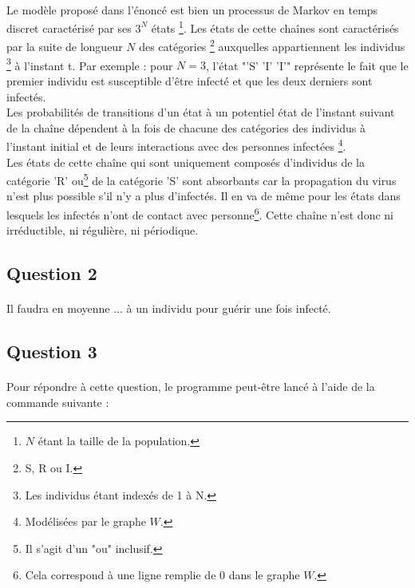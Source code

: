 \documentclass[a4paper, 12pt, oneside]{article}
\begin{document}
\paragraph{}Le modèle proposé dans l'énoncé est bien un processus de Markov en temps discret caractérisé par ses $3^N$ états \footnote{$N$ étant la taille de la population.}. Les états de cette chaînes sont caractérisés par la suite de longueur $N$ des catégories \footnote{S, R ou I.} auxquelles appartiennent les individus \footnote{Les individus étant indexés de 1 à N.} à l'instant t. Par exemple : pour $N = 3$, l'état "'S' 'I' 'I'" représente le fait que le premier individu est susceptible d'être infecté et que les deux derniers sont infectés.\\
\indent Les probabilités de transitions d'un état à un potentiel état de l'instant suivant de la chaîne dépendent à la fois de chacune des catégories des individus à l'instant initial et de leurs interactions avec des personnes infectées \footnote{Modélisées par le graphe $W$.}.\\
\indent Les états de cette chaîne qui sont uniquement composés d'individus de la catégorie 'R' ou\footnote{Il s'agit d'un "ou" inclusif.} de la catégorie 'S' sont absorbants car la propagation du virus n'est plus possible s'il n'y a plus d'infectés. Il en va de même pour les états dans lesquels les infectés n'ont de contact avec personne\footnote{Cela correspond à une ligne remplie de 0 dans le graphe $W$.}. Cette chaîne n'est donc ni irréductible, ni régulière, ni périodique.

\subsection{Question 2}

\paragraph{}Il faudra en moyenne ... à un individu pour guérir une fois infecté.

\subsection{Question 3}

\paragraph{}Pour répondre à cette question, le programme peut-être lancé à l'aide de la commande suivante :
\end{document}
